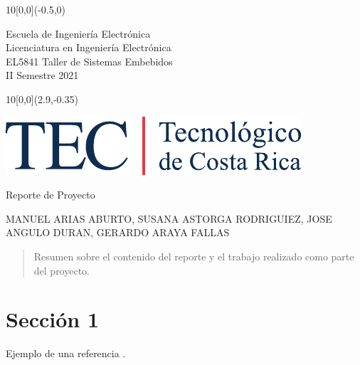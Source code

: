 \documentclass[12pt,letterpaper]{article}
\newcommand{\EstudianteA}{MANUEL ARIAS ABURTO}
\newcommand{\EstudianteB}{SUSANA ASTORGA RODRIGUIEZ}
\newcommand{\EstudianteC}{JOSE ANGULO DURAN}
\newcommand{\EstudianteD}{GERARDO ARAYA FALLAS}
\begin{document}
	
\graphicspath{{./}{./fig/}}


\begin{textblock}{10}[0,0](-0.5,0)
	\begin{flushleft}
		\large 
		Escuela de Ingeniería Electrónica \\
		Licenciatura en Ingeniería Electrónica \\
		EL5841 Taller de Sistemas Embebidos \\
		II Semestre 2021
	\end{flushleft}
\end{textblock}

\begin{textblock}{10}[0,0](2.9,-0.35)
	\begin{flushright}
		\includegraphics[scale=0.8]{Firma_TEC-4.pdf}
	\end{flushright}
\end{textblock}

\begin{center}
	\vspace{3.5cm}
	{\Large\color{tecRojo} Reporte de Proyecto }
	\par\vspace{1.0cm}
	{\LARGE\bf\color{tecAzul}{Proyecto 1: Diseño de sistemas usando High-Level
Synthesis
}}
	\par\vspace{1.0cm}
	{\large{\EstudianteA, \EstudianteB, \EstudianteC, \EstudianteD} 
	\vspace{0.75cm}}
\end{center}



\begin{abstract}
Resumen sobre el contenido del reporte y el trabajo realizado como parte del 
proyecto.
\end{abstract}


\section{Sección 1}
Ejemplo de una referencia \cite{legup}.
\end{document}
